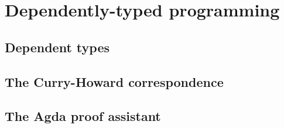 \chapter{Dependently-typed programming}

\section{Dependent types}

\section{The Curry-Howard correspondence}

\section{The Agda proof assistant}
